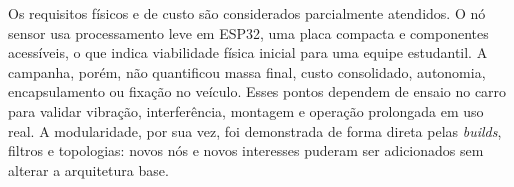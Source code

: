 Os requisitos físicos e de custo são considerados parcialmente atendidos. O
nó sensor usa processamento leve em ESP32, uma placa compacta e componentes
acessíveis, o que indica viabilidade física inicial para uma equipe estudantil.
A campanha, porém, não quantificou massa final, custo consolidado, autonomia,
encapsulamento ou fixação no veículo. Esses pontos dependem de ensaio no carro
para validar vibração, interferência, montagem e operação prolongada em uso real.
A modularidade, por sua vez, foi demonstrada de forma direta pelas \emph{builds}, filtros
e topologias: novos nós e novos interesses puderam ser adicionados sem alterar a
arquitetura base.
